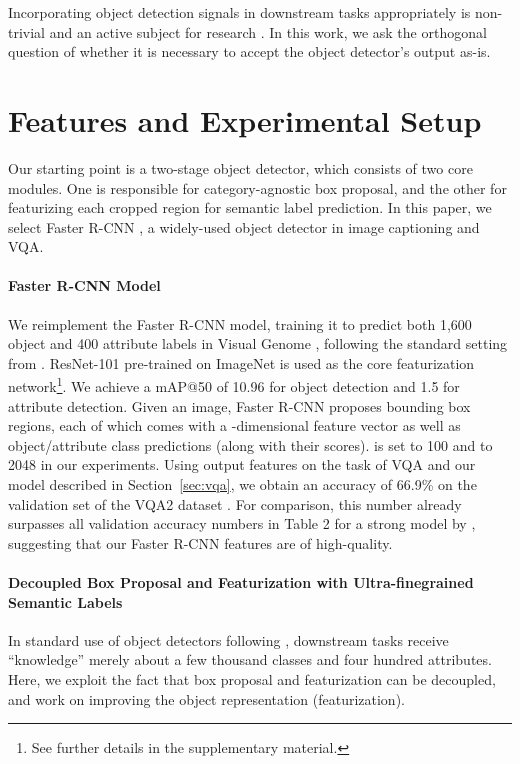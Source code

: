 \documentclass[11pt,a4paper]{article}
\begin{document}
Incorporating object detection signals in downstream tasks appropriately is non-trivial and an active subject for research \cite{santoro17relational,zhang18counter}.
In this work, we ask the orthogonal question of whether it is necessary to accept the object detector's output as-is.
 \section{Features and Experimental Setup}
\label{s:setup}
Our starting point is a two-stage object detector, which consists of two core modules.
One is responsible for category-agnostic box proposal, and the other for featurizing each cropped region for semantic label prediction.
In this paper, we select Faster R-CNN \cite{ren15frcnn}, a widely-used object detector in image captioning and VQA.

\paragraph{Faster R-CNN Model}
We reimplement the Faster R-CNN model, training it to predict both 1,600 object and 400 attribute labels in Visual Genome \cite{krishnavisualgenome},
following the standard setting from .
ResNet-101 \cite{resnet2016} pre-trained on ImageNet \cite{imagenet15} is used as the core featurization network\footnote{See further details in the supplementary material.}.
We achieve a mAP@50 of 10.96 for object detection and 1.5 for attribute detection.
Given an image, Faster R-CNN proposes  bounding box regions, each of which comes with a -dimensional feature vector as well as object/attribute class predictions (along with their scores).
 is set to 100 and  to 2048 in our experiments.
Using output features on the task of VQA and our model described in Section~\ref{sec:vqa}, we obtain an accuracy of 66.9\% on the validation set of the VQA2 dataset \cite{goyal17vqa2}.
For comparison, this number already surpasses all validation accuracy numbers in Table 2 for a strong model by , suggesting that our Faster R-CNN features are of high-quality.

\paragraph{Decoupled Box Proposal and Featurization with Ultra-finegrained Semantic Labels}
In standard use of object detectors following , downstream tasks receive ``knowledge'' merely about a few thousand classes and four hundred attributes.
Here, we exploit the fact that box proposal and featurization can be decoupled, and work on improving the object representation (featurization).
\end{document}
